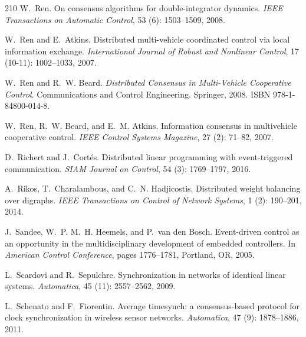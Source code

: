 \documentclass{autart}
\begin{document}
{\begin{thebibliography}{210}
W.~Ren.
\newblock On consensus algorithms for double-integrator dynamics.
\newblock \emph{IEEE Transactions on Automatic Control}, 53
  (6): 1503--1509, 2008{}.

W.~Ren and E.~Atkins.
\newblock Distributed multi-vehicle coordinated control via local information
  exchange.
\newblock \emph{International Journal of Robust and Nonlinear Control},
  17 (10-11): 1002--1033, 2007.

W.~Ren and R.~W. Beard.
\newblock \emph{Distributed Consensus in Multi-Vehicle Cooperative Control}.
\newblock Communications and Control Engineering. Springer, 2008.
\newblock ISBN 978-1-84800-014-8.

W.~Ren, R.~W. Beard, and E.~M. Atkins.
\newblock Information consensus in multivehicle cooperative control.
\newblock \emph{IEEE Control Systems Magazine}, 27 (2):
  71--82, 2007.

D.~Richert and J.~Cort\'es.
\newblock Distributed linear programming with event-triggered communication.
\newblock \emph{SIAM Journal on Control}, 54 (3): 1769--1797,
  2016.

A.~Rikos, T.~Charalambous, and C.~N. Hadjicostis.
\newblock Distributed weight balancing over digraphs.
\newblock \emph{IEEE Transactions on Control of Network Systems}, 1
  (2): 190--201, 2014.

J.~Sandee, W.~P. M.~H. Heemels, and P.~{van den Bosch}.
\newblock Event-driven control as an opportunity in the multidisciplinary
  development of embedded controllers.
\newblock In \emph{{A}merican {C}ontrol {C}onference}, pages 1776--1781,
  Portland, OR, 2005.

L.~Scardovi and R.~Sepulchre.
\newblock Synchronization in networks of identical linear systems.
\newblock \emph{Automatica}, 45 (11): 2557--2562, 2009.

L.~Schenato and F.~Fiorentin.
\newblock Average timesynch: a consensus-based protocol for clock
  synchronization in wireless sensor networks.
\newblock \emph{Automatica}, 47 (9): 1878--1886, 2011.


\end{thebibliography}}
\end{document}
